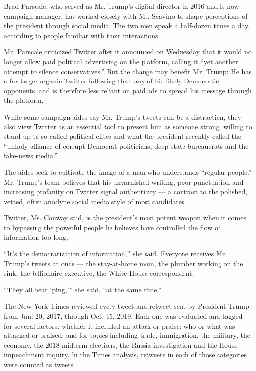 Brad Parscale, who served as Mr. Trump's digital director in 2016 and is
now campaign manager, has worked closely with Mr. Scavino to shape
perceptions of the president through social media. The two men speak a
half-dozen times a day, according to people familiar with their
interactions.

Mr. Parscale criticized Twitter after it announced on Wednesday that it
would no longer allow paid political advertising on the platform,
calling it ``yet another attempt to silence conservatives.'' But the
change may benefit Mr. Trump: He has a far larger organic Twitter
following than any of his likely Democratic opponents, and is therefore
less reliant on paid ads to spread his message through the platform.

While some campaign aides say Mr. Trump's tweets can be a distraction,
they also view Twitter as an essential tool to present him as someone
strong, willing to stand up to so-called political elites and what the
president recently called the ``unholy alliance of corrupt Democrat
politicians, deep-state bureaucrats and the fake-news media.''

The aides seek to cultivate the image of a man who understands ``regular
people.'' Mr. Trump's team believes that his unvarnished writing, poor
punctuation and increasing profanity on Twitter signal authenticity ---
a contrast to the polished, vetted, often anodyne social media style of
most candidates.

Twitter, Ms. Conway said, is the president's most potent weapon when it
comes to bypassing the powerful people he believes have controlled the
flow of information too long.

``It's the democratization of information,'' she said. Everyone receives
Mr. Trump's tweets at once --- the stay-at-home mom, the plumber working
on the sink, the billionaire executive, the White House correspondent.

``They all hear `ping,''' she said, ``at the same time.''

The New York Times reviewed every tweet and retweet sent by President
Trump from Jan. 20, 2017, through Oct. 15, 2019. Each one was evaluated
and tagged for several factors: whether it included an attack or praise;
who or what was attacked or praised; and for topics including trade,
immigration, the military, the economy, the 2018 midterm elections, the
Russia investigation and the House impeachment inquiry. In the Times
analysis, retweets in each of those categories were counted as tweets.


